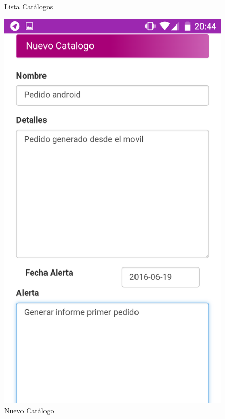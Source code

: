 \documentclass[a4paper,11pt]{book}
\begin{document}
\begin{figure}[H]
  \caption{Lista Catálogos\cite{propio}}
\endminipage\hfill
{}
  \includegraphics[width=\linewidth]{imagenes/pruebas/movil/movil10.png}
  \caption{Nuevo Catálogo\cite{propio}}
\endminipage\hfill
\end{figure}
\end{document}
